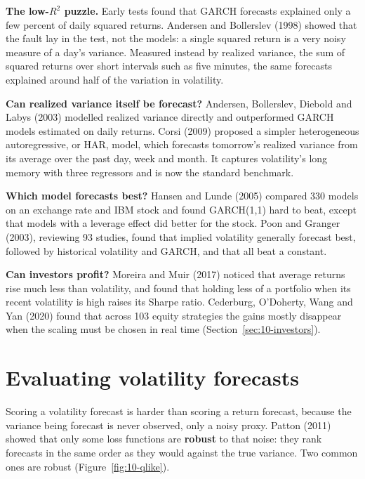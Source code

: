 \textbf{The low-$R^2$ puzzle.} Early tests found that GARCH forecasts explained only a few percent of daily squared returns. Andersen and Bollerslev (1998) showed that the fault lay in the test, not the models: a single squared return is a very noisy measure of a day's variance. Measured instead by realized variance, the sum of squared returns over short intervals such as five minutes, the same forecasts explained around half of the variation in volatility.

\textbf{Can realized variance itself be forecast?} Andersen, Bollerslev, Diebold and Labys (2003) modelled realized variance directly and outperformed GARCH models estimated on daily returns. Corsi (2009) proposed a simpler heterogeneous autoregressive, or HAR, model, which forecasts tomorrow's realized variance from its average over the past day, week and month. It captures volatility's long memory with three regressors and is now the standard benchmark.

\textbf{Which model forecasts best?} Hansen and Lunde (2005) compared 330 models on an exchange rate and IBM stock and found GARCH(1,1) hard to beat, except that models with a leverage effect did better for the stock. Poon and Granger (2003), reviewing 93 studies, found that implied volatility generally forecast best, followed by historical volatility and GARCH, and that all beat a constant.

\textbf{Can investors profit?} Moreira and Muir (2017) noticed that average returns rise much less than volatility, and found that holding less of a portfolio when its recent volatility is high raises its Sharpe ratio. Cederburg, O'Doherty, Wang and Yan (2020) found that across 103 equity strategies the gains mostly disappear when the scaling must be chosen in real time (Section~\ref{sec:10-investors}).

\section{Evaluating volatility forecasts}
\label{sec:10-eval}

Scoring a volatility forecast is harder than scoring a return forecast, because the variance being forecast is never observed, only a noisy proxy. Patton (2011) showed that only some loss functions are \textbf{robust} to that noise: they rank forecasts in the same order as they would against the true variance. Two common ones are robust (Figure~\ref{fig:10-qlike}).

